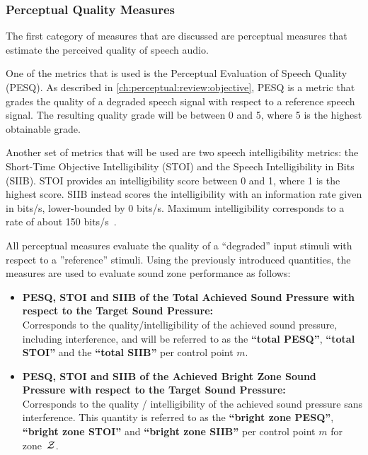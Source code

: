 \subsubsection{Perceptual Quality Measures}
The first category of measures that are discussed are perceptual measures that estimate the perceived 
quality of speech audio.

One of the metrics that is used is the Perceptual Evaluation of Speech Quality (PESQ).
As described in \autoref{ch:perceptual:review:objective}, PESQ is a metric that grades the quality of a 
degraded speech signal with respect to a reference speech signal.
The resulting quality grade will be between 0 and 5, where 5 is the highest obtainable grade.

Another set of metrics that will be used are two speech intelligibility metrics: 
the Short-Time Objective Intelligibility (STOI) and 
the Speech Intelligibility in Bits (SIIB).
STOI provides an intelligibility score between 0 and 1, where 1 is the highest score.
SIIB instead scores the intelligibility with an information rate given in bits/s, lower-bounded by 0 bits/s.
Maximum intelligibility corresponds to a rate of about 150 bits/s~\cite{van2017instrumental}.

All perceptual measures evaluate the quality of a ``degraded'' input stimuli with respect to a ''reference'' stimuli.
Using the previously introduced quantities, the measures are used to evaluate sound zone performance as follows:
\begin{itemize}
    \item \textbf{PESQ, STOI and SIIB of the Total Achieved Sound Pressure with 
        respect to the Target Sound Pressure:}\\
        Corresponds to the quality/intelligibility of the achieved sound pressure,
        including interference, and will be referred 
        to as the \textbf{``total PESQ''}, \textbf{``total STOI''} and the \textbf{``total SIIB''} per control point $m$. 
    \item \textbf{PESQ, STOI and SIIB of the Achieved Bright Zone Sound Pressure with 
        respect to the Target Sound Pressure:}\\
        Corresponds to the quality / intelligibility of the achieved sound pressure sans interference.
        This quantity is referred to as the \textbf{``bright zone PESQ''}, \textbf{``bright zone STOI''} and \textbf{``bright zone SIIB''}
        per control point $m$ for zone~$\mathcal{Z}$.
\end{itemize}

